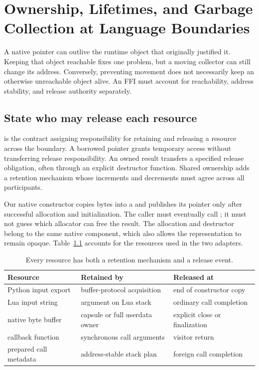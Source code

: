 \chapter{Ownership, Lifetimes, and Garbage Collection at Language Boundaries}
\label{ch:ffi-ownership}

A native pointer can outlive the runtime object that originally justified it.
Keeping that object reachable fixes one problem, but a moving collector can still change its address.
Conversely, preventing movement does not necessarily keep an otherwise unreachable object alive.
An FFI must account for reachability, address stability, and release authority separately.

\section{State who may release each resource}
\label{sec:ch72-ownership}
 is the contract assigning responsibility for retaining and releasing a resource across the boundary.
A borrowed pointer grants temporary access without transferring release responsibility.
An owned result transfers a specified release obligation, often through an explicit destructor function.
Shared ownership adds a retention mechanism whose increments and decrements must agree across all participants.

Our native constructor copies bytes into a  and publishes its pointer only after successful allocation and initialization.
The caller must eventually call ; it must not guess which allocator can free the result.
The allocation and destructor belong to the same native component, which also allows the representation to remain opaque.
Table~\ref{tab:ch72-resources} accounts for the resources used in the two adapters.

\begin{table}[htbp]
\caption{Every resource has both a retention mechanism and a release event.}
\label{tab:ch72-resources}
\centering
\begin{tabular}{lll}
\toprule
Resource & Retained by & Released at \\
\midrule
Python input export & buffer-protocol acquisition & end of constructor copy \\
Lua input string & argument on Lua stack & ordinary call completion \\
native byte buffer & capsule or full userdata owner & explicit close or finalization \\
callback function & synchronous call arguments & visitor return \\
prepared call metadata & address-stable stack plan & foreign call completion \\
\bottomrule
\end{tabular}
\end{table}

